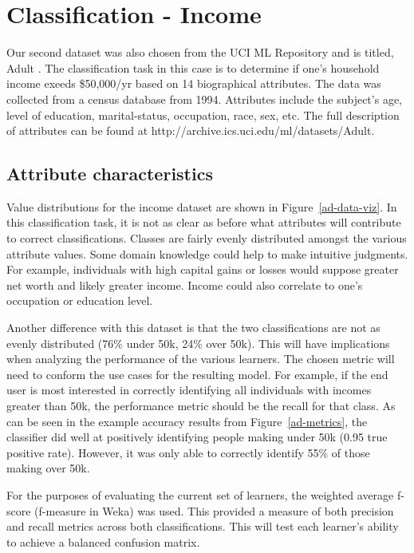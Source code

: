 \documentclass{sig-alternate}
\begin{document}
\section{Classification - Income}

Our second dataset was also chosen from the UCI ML Repository and is titled, Adult \cite{Bache+Lichman:2013}. The classification task in this case is to determine if one's household income exeeds \$50,000/yr based on 14 biographical attributes. The data was collected from a census database from 1994. Attributes include the subject's age, level of education, marital-status, occupation, race, sex, etc. The full description of attributes can be found at http://archive.ics.uci.edu/ml/datasets/Adult.

\subsection{Attribute characteristics}

Value distributions for the income dataset are shown in Figure~\ref{ad-data-viz}. In this classification task, it is not as clear as before what attributes will contribute to correct classifications. Classes are fairly evenly distributed amongst the various attribute values. Some domain knowledge could help to make intuitive judgments. For example, individuals with high capital gains or losses would suppose greater net worth and likely greater income. Income could also correlate to one's occupation or education level.

Another difference with this dataset is that the two classifications are not as evenly distributed (76\% under 50k, 24\% over 50k). This will have implications when analyzing the performance of the various learners. The chosen metric will need to conform the use cases for the resulting model. For example, if the end user is most interested in correctly identifying all individuals with incomes greater than 50k, the performance metric should be the recall for that class. As can be seen in the example accuracy results from Figure~\ref{ad-metrics}, the classifier did well at positively identifying people making under 50k (0.95 true positive rate). However, it was only able to correctly identify 55\% of those making over 50k.

For the purposes of evaluating the current set of learners, the weighted average f-score (f-measure in Weka) was used. This provided a measure of both precision and recall metrics across both classifications. This will test each learner's ability to achieve a balanced confusion matrix.
\end{document}
